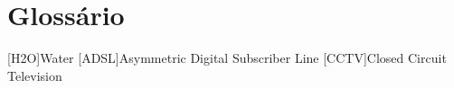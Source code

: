 \chapter{Glossário}

\footnotesize
\SingleSpacing

\begin{multicols}{2}
\begin{acronym}[AAAAAA]

	[H2O]{Water}
	[ADSL]{Asymmetric Digital Subscriber Line}
	[CCTV]{Closed Circuit Television}

\end{acronym}
\end{multicols}

